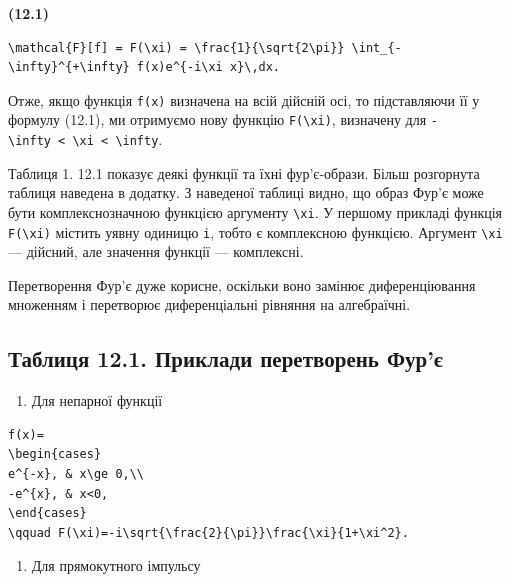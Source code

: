 \documentclass[
  ukrainian,
]{article}
\providecommand{\tightlist}{%
  \setlength{\itemsep}{0pt}\setlength{\parskip}{0pt}}
\begin{document}
\textbf{(12.1)}

\begin{verbatim}
\mathcal{F}[f] = F(\xi) = \frac{1}{\sqrt{2\pi}} \int_{-\infty}^{+\infty} f(x)e^{-i\xi x}\,dx.
\end{verbatim}

Отже, якщо функція \texttt{f(x)} визначена на всій дійсній осі, то
підставляючи її у формулу (12.1), ми отримуємо нову функцію
\texttt{F(\textbackslash{}xi)}, визначену для
\texttt{-\textbackslash{}infty\ \textless{}\ \textbackslash{}xi\ \textless{}\ \textbackslash{}infty}.

Таблиця 1. 12.1 показує деякі функції та їхні фур'є-образи. Більш
розгорнута таблиця наведена в додатку. З наведеної таблиці видно, що
образ Фур'є може бути комплекснозначною функцією аргументу
\texttt{\textbackslash{}xi}. У першому прикладі функція
\texttt{F(\textbackslash{}xi)} містить уявну одиницю \texttt{i}, тобто є
комплексною функцією. Аргумент \texttt{\textbackslash{}xi} --- дійсний,
але значення функції --- комплексні.

Перетворення Фур'є дуже корисне, оскільки воно замінює диференціювання
множенням і перетворює диференціальні рівняння на алгебраїчні.

\subsection{Таблиця 12.1. Приклади перетворень
Фур'є}\label{ux442ux430ux431ux43bux438ux446ux44f-12.1.-ux43fux440ux438ux43aux43bux430ux434ux438-ux43fux435ux440ux435ux442ux432ux43eux440ux435ux43dux44c-ux444ux443ux440ux454}

\begin{enumerate}
\def\labelenumi{\arabic{enumi}.}
\tightlist
\item
  Для непарної функції
\end{enumerate}

\begin{verbatim}
f(x)=
\begin{cases}
e^{-x}, & x\ge 0,\\
-e^{x}, & x<0,
\end{cases}
\qquad F(\xi)=-i\sqrt{\frac{2}{\pi}}\frac{\xi}{1+\xi^2}.
\end{verbatim}

\begin{enumerate}
\def\labelenumi{\arabic{enumi}.}
\setcounter{enumi}{1}
\tightlist
\item
  Для прямокутного імпульсу
\end{enumerate}
\end{document}
